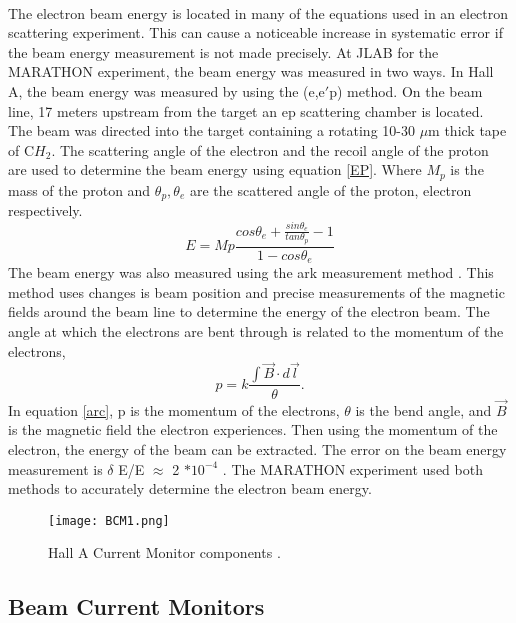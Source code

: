 	 \paragraph{}The electron beam energy is located in many of the equations used in an electron scattering experiment. This can cause a noticeable increase in systematic error if the beam energy measurement is not made precisely. At JLAB for the MARATHON experiment, the beam energy was measured in two ways. In Hall A, the beam energy was measured by using the (e,e$\prime$p) method. On the beam line, 17 meters upstream from the target an ep scattering chamber is located. The beam was directed into the target containing a rotating 10-30 $\mu$m thick tape of C$H_2$. The scattering angle of the electron and the recoil angle of the proton are used to determine the beam energy using equation \ref{EP}. Where $M_p$ is the mass of the proton and $\theta_p, \theta_e$ are the scattered angle of the proton, electron respectively. 
	\begin{equation}
	\label{EP}
	E = Mp \frac{cos\theta_e + \frac{sin\theta_e}{tan\theta_p}-1}{1 - cos\theta_e} 
	\end{equation}
	The beam energy was also measured using the ark measurement method \cite{Flay}. This method uses changes is beam position and precise measurements of the magnetic fields around the beam line to determine the energy of the electron beam. The angle at which the electrons are bent through is related to the momentum of the electrons,
	\begin{equation}
	\label{arc}
	p = k \frac{\int \vec{B} \cdot d\vec{l}}{\theta}.
	\end{equation}	
	In equation \ref{arc}, p is the momentum of the electrons, $\theta$ is the bend angle, and $\vec{B}$ is the magnetic field the electron experiences. Then using the momentum of the electron, the energy of the beam can be extracted. The error on the beam energy measurement is $\delta$ E/E $\approx$ 2 $* 10^{-4} $ \cite{EPMet, Flay}.  The MARATHON experiment used both methods to accurately determine the electron beam energy.
	
		  	\begin{figure}[t]
		  	 	 		\centering
		  	 	 		\caption{Hall A Current Monitor components \cite{BCM1}. 
		  	 	 		\label{BCMpng}}
		  	 	 		\texttt{[image: BCM1.png]} 
		  	\end{figure}
	\subsection{Beam Current Monitors}
